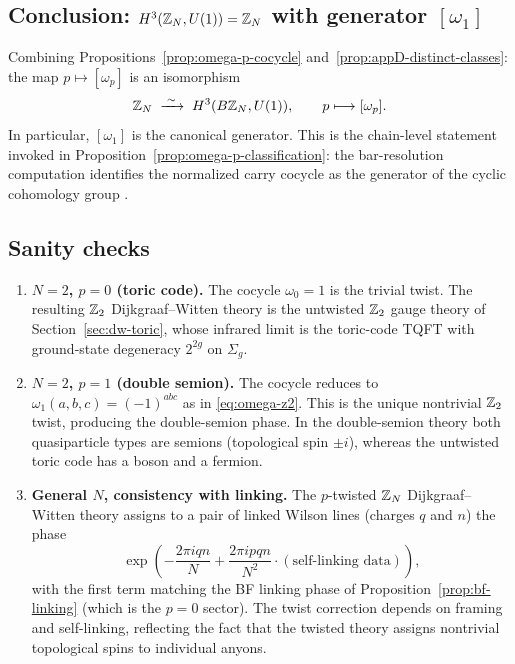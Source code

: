 \subsection{Conclusion: \texorpdfstring{$H^3(\mathbb{Z}_N,U(1))=\mathbb{Z}_N$}{H3(ZN,U(1))=ZN} with generator \texorpdfstring{$[\omega_1]$}{[omega\_1]}}

Combining Propositions~\ref{prop:omega-p-cocycle} and~\ref{prop:appD-distinct-classes}: the map $p\mapsto[\omega_p]$ is an isomorphism
\begin{equation}\label{eq:appD-final-iso}
\mathbb{Z}_N\;\xrightarrow{\;\sim\;}\;H^3(B\mathbb{Z}_N,U(1)),\qquad p\longmapsto[\omega_p].
\end{equation}
In particular, $[\omega_1]$ is the canonical generator. This is the chain-level statement invoked in Proposition~\ref{prop:omega-p-classification}: the bar-resolution computation identifies the normalized carry cocycle as the generator of the cyclic cohomology group \cite{Brown1982,DijkgraafWitten1990}.

\subsection{Sanity checks}\label{subsec:appD-sanity}

\begin{enumerate}
\item \textbf{$N=2$, $p=0$ (toric code).} The cocycle $\omega_0=1$ is the trivial twist. The resulting $\mathbb{Z}_2$ Dijkgraaf--Witten theory is the untwisted $\mathbb{Z}_2$ gauge theory of Section~\ref{sec:dw-toric}, whose infrared limit is the toric-code TQFT with ground-state degeneracy $2^{2g}$ on $\Sigma_g$.

\item \textbf{$N=2$, $p=1$ (double semion).} The cocycle reduces to $\omega_1(a,b,c)=(-1)^{abc}$ as in \eqref{eq:omega-z2}. This is the unique nontrivial $\mathbb{Z}_2$ twist, producing the double-semion phase. In the double-semion theory both quasiparticle types are semions (topological spin $\pm i$), whereas the untwisted toric code has a boson and a fermion.

\item \textbf{General $N$, consistency with linking.} The $p$-twisted $\mathbb{Z}_N$ Dijkgraaf--Witten theory assigns to a pair of linked Wilson lines (charges $q$ and $n$) the phase
\begin{equation}\label{eq:appD-twisted-linking}
\exp\!\left(-\frac{2\pi iqn}{N}+\frac{2\pi ipqn}{N^2}\cdot(\text{self-linking data})\right),
\end{equation}
with the first term matching the BF linking phase of Proposition~\ref{prop:bf-linking} (which is the $p=0$ sector). The twist correction depends on framing and self-linking, reflecting the fact that the twisted theory assigns nontrivial topological spins to individual anyons.
\end{enumerate}
